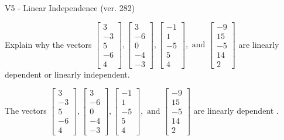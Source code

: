 \begin{exercise}
  \begin{exerciseTitle}V5 - Linear Independence (ver. 282)\end{exerciseTitle}
  \begin{exerciseStatement}
    Explain why the vectors \(\left[\begin{array}{r}
3 \\
-3 \\
5 \\
-6 \\
4
\end{array}\right] , \left[\begin{array}{r}
3 \\
-6 \\
0 \\
-4 \\
-3
\end{array}\right] , \left[\begin{array}{r}
-1 \\
1 \\
-5 \\
5 \\
4
\end{array}\right] , \text{ and } \left[\begin{array}{r}
-9 \\
15 \\
-5 \\
14 \\
2
\end{array}\right]\) are linearly dependent or linearly independent.	


  \end{exerciseStatement}
  \begin{exerciseAnswer}
   The vectors \(\left[\begin{array}{r}
3 \\
-3 \\
5 \\
-6 \\
4
\end{array}\right] , \left[\begin{array}{r}
3 \\
-6 \\
0 \\
-4 \\
-3
\end{array}\right] , \left[\begin{array}{r}
-1 \\
1 \\
-5 \\
5 \\
4
\end{array}\right] , \text{ and } \left[\begin{array}{r}
-9 \\
15 \\
-5 \\
14 \\
2
\end{array}\right]\) are 
  	 linearly dependent  .
  


  \end{exerciseAnswer}
\end{exercise}